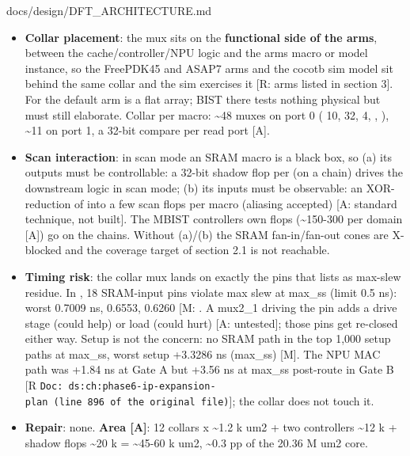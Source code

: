 \begin{relocated}{docs/design/DFT_ARCHITECTURE.md}
\begin{itemize}
\tightlist
\item
  \textbf{Collar placement}: the mux sits on the \textbf{functional side
  of the  arms}, between the
  cache/\allowbreak{}controller/\allowbreak{}NPU logic and the
  arm\textquotesingle s macro or model instance, so the FreePDK45 and
  ASAP7 arms and the cocotb sim model sit behind the same collar and the
  sim exercises it {[}R: arms listed in section 3{]}. For
   the default arm is a flat array; BIST there
  tests nothing physical but must still elaborate. Collar per macro:
  \textasciitilde48 muxes on port 0 ( 10,  32,
   4, , ), \textasciitilde11 on port
  1, a 32-bit compare per read port {[}A{]}.
\item
  \textbf{Scan interaction}: in scan mode an SRAM macro is a black box,
  so (a) its outputs must be controllable: a 32-bit shadow flop per
   (on a chain) drives the downstream logic in scan mode; (b)
  its inputs must be observable: an XOR-reduction of
   into a few scan flops per macro
  (aliasing accepted) {[}A: standard technique, not built{]}. The MBIST
  controller\textquotesingle s own flops (\textasciitilde150-300 per
  domain {[}A{]}) go on the chains. Without (a)/(b) the SRAM
  fan-in/\allowbreak{}fan-out cones are X-blocked and the coverage
  target of section 2.1 is not reachable.
\item
  \textbf{Timing risk}: the collar mux lands on exactly the pins that
   lists as max-slew residue. In
  , 18 SRAM-input pins violate max slew at
  max\_ss (limit 0.5 ns): worst  0.7009 ns,
   0.6553,  0.6260 {[}M:
  \code{51-openroad-stapostpnr/max_ss_100C_1v60/checks.rpt}{]}. A
  mux2\_1 driving the pin adds a drive stage (could help) or load (could
  hurt) {[}A: untested{]}; those pins get re-closed either way. Setup is
  not the concern: no SRAM path in the top 1,000 setup paths at max\_ss,
  worst setup +3.3286 ns (max\_ss) {[}M{]}. The NPU MAC path was +1.84
  ns at Gate A but +3.56 ns at max\_ss post-route in Gate B {[}R
  \texttt{Doc:\allowbreak{}\ ds:\allowbreak{}ch:\allowbreak{}phase6-\allowbreak{}ip-\allowbreak{}expansion-\allowbreak{}plan\ (line\ 896\ of\ the\ original\ file)}{]};
  the collar does not touch it.
\item
  \textbf{Repair}: none. \textbf{Area {[}A{]}}: 12 collars x
  \textasciitilde1.2 k um2 + two controllers \textasciitilde12 k +
  shadow flops \textasciitilde20 k = \textasciitilde45-60 k um2,
  \textasciitilde0.3 pp of the 20.36 M um2 core.
\end{itemize}


\end{relocated}
